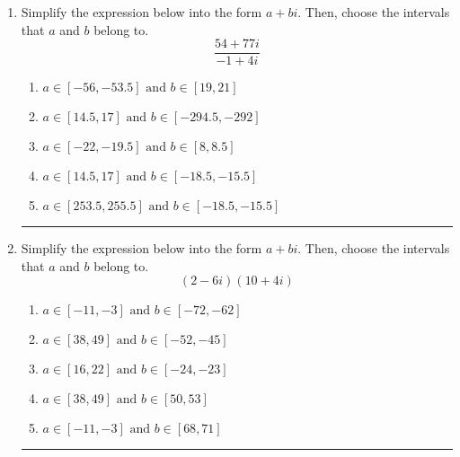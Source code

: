 \documentclass[14pt]{extbook}
\newcommand{\litem}[1]{\item#1\hspace*{-1cm}\rule{\textwidth}{0.4pt}}
\begin{document}
\begin{enumerate}
\litem{
Simplify the expression below into the form $a+bi$. Then, choose the intervals that $a$ and $b$ belong to.\[ \frac{54 + 77 i}{-1 + 4 i} \]\begin{enumerate}[label=\Alph*.]
\item \( a \in [-56, -53.5] \text{ and } b \in [19, 21] \)
\item \( a \in [14.5, 17] \text{ and } b \in [-294.5, -292] \)
\item \( a \in [-22, -19.5] \text{ and } b \in [8, 8.5] \)
\item \( a \in [14.5, 17] \text{ and } b \in [-18.5, -15.5] \)
\item \( a \in [253.5, 255.5] \text{ and } b \in [-18.5, -15.5] \)

\end{enumerate} }
\litem{
Simplify the expression below into the form $a+bi$. Then, choose the intervals that $a$ and $b$ belong to.\[ (2 - 6 i)(10 + 4 i) \]\begin{enumerate}[label=\Alph*.]
\item \( a \in [-11, -3] \text{ and } b \in [-72, -62] \)
\item \( a \in [38, 49] \text{ and } b \in [-52, -45] \)
\item \( a \in [16, 22] \text{ and } b \in [-24, -23] \)
\item \( a \in [38, 49] \text{ and } b \in [50, 53] \)
\item \( a \in [-11, -3] \text{ and } b \in [68, 71] \)

\end{enumerate} }
\end{enumerate}
\end{document}
